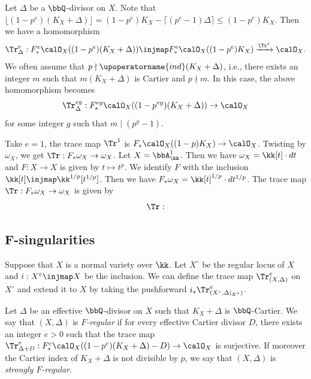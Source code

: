 Let $\Delta$ be a $\bbQ$-divisor on $X$.
Note that $\lfloor (1-p^e)(K_X+\Delta) \rfloor = (1-p^e)K_X - \lceil (p^e-1)\Delta \rceil \leq (1-p^e) K_X$.
Then we have a homomorphism
\[ \Tr_\Delta^e: F^e_* \calO_X((1-p^e)(K_X+\Delta)) \injmap F^e_* \calO_X((1-p^e)K_X) \xrightarrow{\Tr^e} \calO_X. \]
We often assume that $p \nmid \upoperatorname{ind}(K_X+\Delta)$, i.e., there exists an integer $m$ such that $m(K_X+\Delta)$ is Cartier and $p \nmid m$.
In this case, the above homomorphism becomes
\[ \Tr_\Delta^{eg}: F^{eg}_* \calO_X((1-p^{eg})(K_X+\Delta)) \to \calO_X \]
for some integer $g$ such that $m \mid (p^g-1)$.

\begin{example}
	Take $e=1$, the trace map $\Tr^1$ is $F_* \calO_X((1-p)K_X) \to \calO_X$.
	Twisting by $\omega_X$, we get $\Tr: F_* \omega_X \to \omega_X$.
	Let $X = \bbA^1_\kk$.
	Then we have $\omega_X = \kk[t] \cdot dt$ and $F:X \to X$ is given by $t \mapsto t^p$.
	We identify $F$ with the inclusion $\kk[t] \injmap \kk^{1/p}[t^{1/p}]$.
	Then we have $F_* \omega_X = \kk[t]^{1/p} \cdot dt^{1/p}$.
	The trace map $\Tr: F_* \omega_X \to \omega_X$ is given by
	\[ \Tr: \]
	\Yang{}
\end{example}


\subsection{F-singularities}

Suppose that $X$ is a normal variety over $\kk$.
Let $X^\circ$ be the regular locus of $X$ and $i: X^\circ \injmap X$ be the inclusion.
We can define the trace map $\Tr_{(X,\Delta)}^e$ on $X^\circ$ and extend it to $X$ by taking the pushforward $i_* \Tr_{(X^\circ, \Delta|_{X^\circ})}^e$.

\begin{definition}
	Let $\Delta$ be an effective $\bbQ$-divisor on $X$ such that $K_X+\Delta$ is $\bbQ$-Cartier.
	We say that $(X,\Delta)$ is \emph{$F$-regular} if for every effective Cartier divisor $D$, there exists an integer $e>0$ such that the trace map $\Tr_{\Delta+D}^e: F^e_* \calO_X((1-p^e)(K_X+\Delta)-D) \to \calO_X$ is surjective.
	If moreover the Cartier index of $K_X+\Delta$ is not divisible by $p$, we say that $(X,\Delta)$ is \emph{strongly $F$-regular}.
\end{definition}

\begin{example}

	\Yang{}
\end{example}

